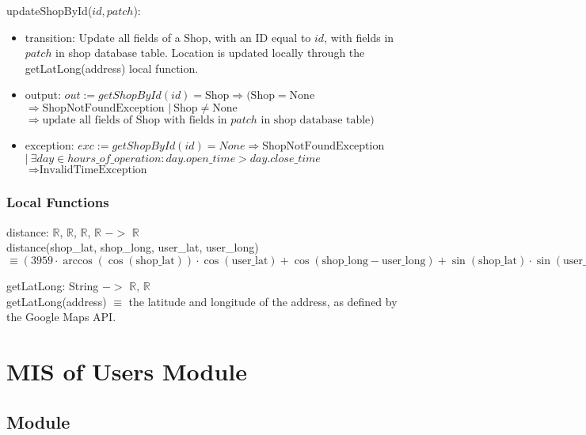 \documentclass[12pt, titlepage]{article}
\begin{document}
\noindent updateShopById($id, patch$):
\begin{itemize}
	\item transition: Update all fields of a Shop, with an ID equal to $id$, with fields in $patch$ in shop
	      database table. Location is updated locally through the getLatLong(address) local function.
	\item output: $out := getShopById(id) = \text{Shop} \Rightarrow (\text{Shop} = \text{None} $ \\
		      $\Rightarrow \text{ShopNotFoundException } |\ \text{Shop} \neq \text{None}$ \\ $\Rightarrow
		      \text{update all fields of Shop with fields in } patch \text{ in shop database table})$
	\item exception: $exc := getShopById(id) = None \Rightarrow \text{ShopNotFoundException}$ \\ $|\ \exists
		      day \in hours\_of\_operation : day.open\_time > day.close\_time$ \\ $\Rightarrow
		      \text{InvalidTimeException}$
\end{itemize}

\subsubsection{Local Functions}

distance: $\mathbb{R}$, $\mathbb{R}$, $\mathbb{R}$, $\mathbb{R}$ $->$ $\mathbb{R}$ \\

distance(shop\_lat, shop\_long, user\_lat, user\_long) $\equiv (3959 \cdot
	\arccos(\cos(\text{shop\_lat})) \cdot \cos(\text{user\_lat}) + \cos(\text{shop\_long} -
		\text{user\_long}) + \sin(\text{shop\_lat}) \cdot \sin(\text{user\_lat}))$

getLatLong: String $->$ $\mathbb{R}$, $\mathbb{R}$ \\

getLatLong(address) $\equiv$ the latitude and longitude of the address, as defined by the Google
Maps API. \\ \newpage

\section{MIS of Users Module} \label{mUsers}
\subsection{Module}
\end{document}
